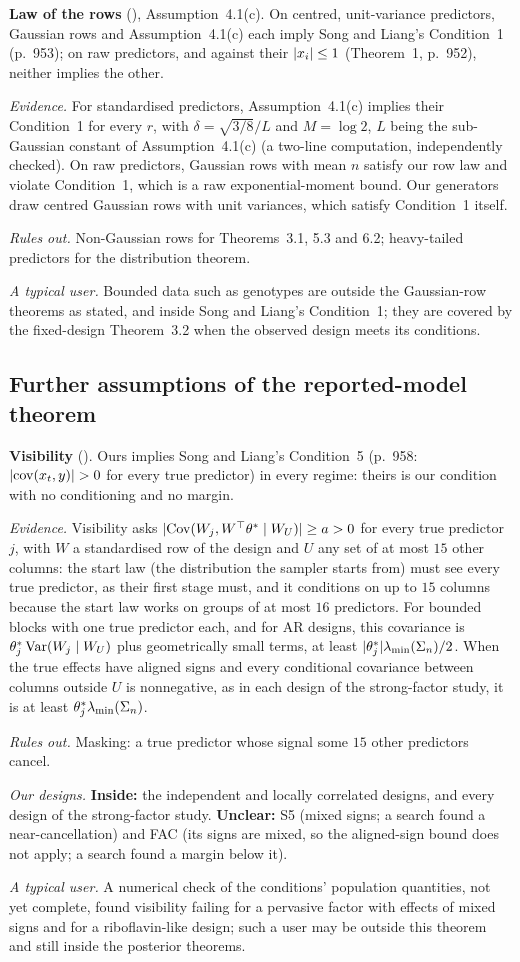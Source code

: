 \documentclass[11pt]{article}
\newcommand{\lab}[1]{\textup{(\asmdisp{#1})}}
\newcommand{\SL}{Song and Liang}
\newcommand{\ahead}[3]{\par\smallskip\noindent\textbf{#1} #2. #3\par}
\newcommand{\ev}[1]{\noindent\emph{Evidence.} #1\par}
\newcommand{\ro}[1]{\noindent\emph{Rules out.} #1\par}
\newcommand{\ds}[1]{\noindent\emph{Our designs.} #1\par}
\newcommand{\tu}[1]{\noindent\emph{A typical user.} #1\par}
\begin{document}
\ahead{Law of the rows}{\lab{GR}, Assumption~4.1(c)}{On centred, unit-variance predictors, Gaussian rows and
Assumption~4.1(c) each imply \SL's Condition~1 (p.~953); on raw predictors, and against their $\lvert x_i\rvert\le1$
(Theorem~1, p.~952), neither implies the other.}
\ev{For standardised predictors, Assumption~4.1(c) implies their Condition~1 for every $r$, with $\delta=\sqrt{3/8}/L$
and $M=\log2$, $L$ being the sub-Gaussian constant of Assumption~4.1(c) (a two-line computation, independently
checked). On raw predictors, Gaussian rows with mean $n$
satisfy our row law and violate Condition~1, which is a raw exponential-moment bound. Our generators draw centred
Gaussian rows with unit variances, which satisfy Condition~1 itself.}
\ro{Non-Gaussian rows for Theorems~3.1, 5.3 and 6.2; heavy-tailed predictors for the distribution theorem.}
\tu{Bounded data such as genotypes are outside the Gaussian-row theorems as stated, and inside \SL's Condition~1; they are
covered by the fixed-design Theorem~3.2 when the observed design meets its conditions.}

\subsection{Further assumptions of the reported-model theorem}\label{sec:a-rm}

\ahead{Visibility}{\lab{V}}{Ours implies \SL's Condition~5 (p.~958: $\lvert \operatorname{cov}(x_t,y)\rvert>0$ for every true
predictor) in every regime: theirs is our condition with no conditioning and no margin.}
\ev{Visibility asks $\lvert \operatorname{Cov}(W_j,W^\top\theta^*\mid W_U)\rvert\ge a>0$ for every true predictor $j$, with $W$ a standardised row of the design and $U$ any set of at most $15$ other columns: the start law (the distribution the sampler starts from) must
see every true predictor, as their first stage must, and it conditions on up to $15$ columns because the start law works on groups of at most $16$ predictors. For bounded blocks with one true predictor each, and for AR
designs, this covariance is $\theta^*_j\operatorname{Var}(W_j\mid W_U)$ plus geometrically small terms, at
least $\lvert \theta^*_j\rvert\lambda_{\min}(\Sigma_n)/2$. When the true effects have aligned signs and every conditional covariance
between columns outside $U$ is nonnegative, as in each design of the strong-factor study, it is at least
$\theta^*_j\lambda_{\min}(\Sigma_n)$.}
\ro{Masking: a true predictor whose signal some $15$ other predictors cancel.}
\ds{\textbf{Inside:} the independent and locally correlated designs, and every design of the strong-factor study.
\textbf{Unclear:} S5 (mixed signs; a search found a near-cancellation) and FAC (its signs are mixed, so the aligned-sign
bound does not apply; a search found a margin below it).}
\tu{A numerical check of the conditions' population quantities, not yet complete, found visibility failing for a
pervasive factor with effects of mixed signs and for a riboflavin-like design; such a user may be outside this theorem
and still inside the posterior theorems.}
\end{document}
